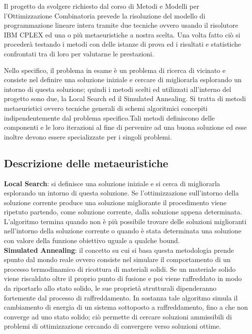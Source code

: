 \documentclass[preprint,12pt]{elsarticle}
\begin{document}
Il progetto da svolgere richiesto dal corso di Metodi e Modelli per l'Ottimizzazione Combinatoria prevede la risoluzione del modello di programmazione lineare intera tramite due tecniche ovvero usando il risolutore IBM CPLEX ed una o più metaeuristiche a nostra scelta. Una volta fatto ciò si procederà testando i metodi con delle istanze di prova ed i risultati e statistiche confrontati tra di loro per valutarne le prestazioni.

Nello specifico, il problema in esame è un problema di ricerca di vicinato e consiste nel definire una soluzione iniziale e cercare di migliorarla esplorando un intorno di questa soluzione; quindi i metodi scelti ed utilizzati all'interno del progetto sono due, la Local Search ed il Simulated Annealing. Si tratta di metodi metaeuristici ovvero tecniche generali di schemi algoritmici concepiti indipendentemente dal problema specifico.Tali metodi definiscono delle componenti e le loro iterazioni al fine di pervenire ad una buona soluzione ed esse inoltre devono essere specializzate per i singoli problemi. \\

\subsection{\textbf{Descrizione delle metaeuristiche}}


\textbf{Local Search}: si definisce una soluzione iniziale e si cerca di migliorarla esplorando un intorno di questa soluzione. Se l'ottimizzazione sull'intorno della soluzione corrente produce una soluzione migliorante il procedimento viene ripetuto partendo, come soluzione corrente, dalla soluzione appena determinata. L'algoritmo termina quando non è più possibile trovare delle soluzioni miglioranti nell'intorno della soluzione corrente o quando è stata determinata una soluzione con valore della funzione obiettivo uguale a qualche bound.\\

\textbf{Simulated Annealing}: il concetto su cui si basa questa metodologia prende spunto dal mondo reale ovvero consiste nel simulare il comportamento di un processo termodinamico di ricottura di materiali solidi. Se un materiale solido viene riscaldato oltre il proprio punto di fusione e poi viene raffreddato in modo da riportarlo allo stato solido, le sue proprietà strutturali dipenderanno fortemente dal processo di raffreddamento. In sostanza tale algoritmo simula il cambiamento di energia di un sistema sottoposto a raffreddamento, fino a che non converge ad uno stato solido; ciò permette di cercare soluzioni ammissibili di problemi di ottimizzazione cercando di convergere verso soluzioni ottime. \\
\end{document}
